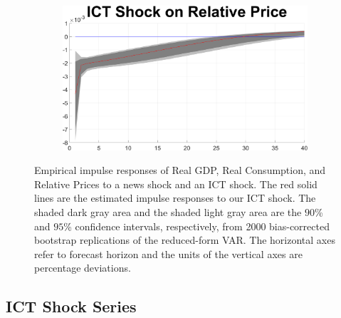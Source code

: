 \documentclass[12pt]{article}
\begin{document}
\begin{figure}[h!]
\begin{subfigure}{.5\textwidth}
\end{subfigure}%
\begin{subfigure}{.5\textwidth}
	\centering
	\includegraphics[width=1\linewidth]{MainFigures/fig_ICT_Shock_on_Relative_Price__controllinNEWS_}
\end{subfigure}
	\caption{Empirical impulse responses of Real GDP, Real Consumption, and Relative Prices to a news shock and an ICT shock. The red solid lines are the estimated impulse responses to our ICT shock. The shaded dark gray area and the shaded light gray area are the $90$\% and $95$\% confidence intervals, respectively, from 2000 bias-corrected bootstrap replications of the reduced-form VAR. The horizontal axes refer to forecast horizon and the units of the vertical axes are percentage deviations.}
\label{fig:2stepIRF_second}
\end{figure}


\newpage


\subsection{ICT Shock Series}\label{section:ICTshockseries_2step}
\end{document}
